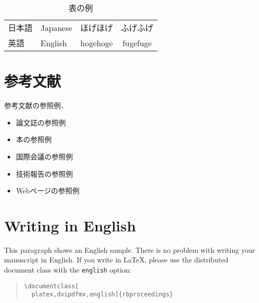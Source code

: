 \documentclass[platex,dvipdfmx]{rbproceedings}
\newcommand{\code}[1]{\texttt{#1}}
\begin{document}
\begin{table}[t]
\centering
\caption{表の例}
\label{tab:sample}
\begin{tabular}{llcc}
\hline
日本語 & Japanese & ほげほげ & ふげふげ \\
英語 & English & hogehoge & fugefuge \\
\hline
\end{tabular}
\end{table}

\section{参考文献}
参考文献の参照例．
\begin{itemize}
\item 論文誌の参照例 \cite{Article_01}
\item 本の参照例 \cite{Book_02}
\item 国際会議の参照例 \cite{Inproc_03}
\item 技術報告の参照例 \cite{Techrep_05}
\item Webページの参照例 \cite{Web_06}
\end{itemize}

\section{Writing in English}
This paragraph shows an English sample.
There is no problem with writing your manuscript in English.
If you write in LaTeX, please use the distributed document class with the \code{english} option:
\begin{quote}
\verb|\documentclass[|\\
\verb|  platex,dvipdfmx,english]{rbproceedings}|
\end{quote}



\end{document}
